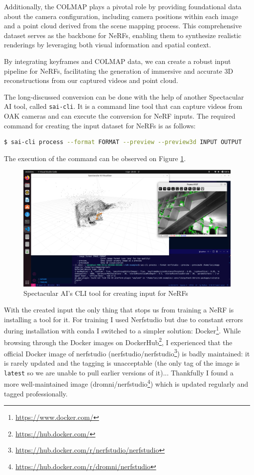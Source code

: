 Additionally, the COLMAP plays a pivotal role by providing foundational data about the camera configuration, including camera positions within each image and a point cloud derived from the scene mapping process\cite{colmap}. This comprehensive dataset serves as the backbone for NeRFs, enabling them to synthesize realistic renderings by leveraging both visual information and spatial context.

By integrating keyframes and COLMAP data, we can create a robust input pipeline for NeRFs, facilitating the generation of immersive and accurate 3D reconstructions from our captured videos and point cloud.

The long-discussed conversion can be done with the help of another Spectacular AI tool, called \verb|sai-cli|. It is a command line tool that can capture videos from OAK cameras and can execute the conversion for NeRF inputs. The required command for creating the input dataset for NeRFs is as follows:

\begin{lstlisting}[language=bash,frame=single,float=!ht]
$ sai-cli process --format FORMAT --preview --preview3d INPUT OUTPUT
\end{lstlisting}

The execution of the command can be observed on Figure \ref{fig:sai_cli_process}. 

\begin{figure}[H]
	\centering
	\includegraphics[width=150mm, keepaspectratio]{figures/sai-cli_process.png}
	\caption{Spectacular AI's CLI tool for creating input for NeRFs}
	\label{fig:sai_cli_process}
\end{figure}

With the created input the only thing that stops us from training a NeRF is installing a tool for it. For training I used Nerfstudio\cite{nerfstudio} but due to constant errors during installation with conda I switched to a simpler solution: Docker\footnote{\url{https://www.docker.com/}}. While browsing through the Docker images on DockerHub\footnote{\url{https://hub.docker.com/}}, I experienced that the official Docker image of nerfstudio (nerfstudio/nerfstudio\footnote{\url{https://hub.docker.com/r/nerfstudio/nerfstudio}}) is badly maintained: it is rarely updated and the tagging is unacceptable (the only tag of the image is \verb|latest| so we are unable to pull earlier versions of it)... Thankfully I found a more well-maintained image (dromni/nerfstudio\footnote{\url{https://hub.docker.com/r/dromni/nerfstudio}}) which is updated regularly and tagged professionally.

